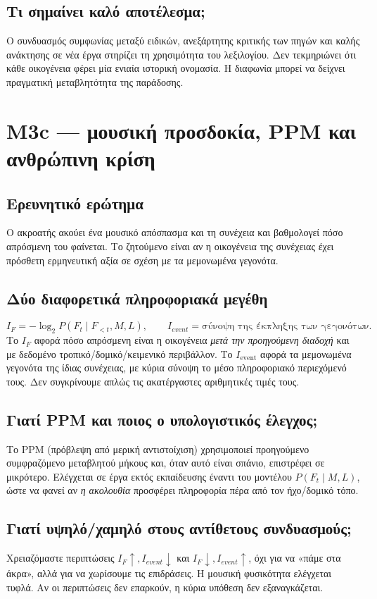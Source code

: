 \documentclass[11pt,a4paper]{extarticle}
\begin{document}
\subsection*{Τι σημαίνει καλό αποτέλεσμα;}
Ο συνδυασμός συμφωνίας μεταξύ ειδικών, ανεξάρτητης κριτικής των πηγών και καλής ανάκτησης σε νέα έργα στηρίζει τη χρησιμότητα του λεξιλογίου. Δεν τεκμηριώνει ότι κάθε οικογένεια φέρει μία ενιαία ιστορική ονομασία. Η διαφωνία μπορεί να δείχνει πραγματική μεταβλητότητα της παράδοσης.



\section{M3c — μουσική προσδοκία, PPM και ανθρώπινη κρίση}
\subsection*{Ερευνητικό ερώτημα}
Ο ακροατής ακούει ένα μουσικό απόσπασμα και τη συνέχεια και βαθμολογεί πόσο απρόσμενη του φαίνεται. Το ζητούμενο είναι αν η οικογένεια της συνέχειας έχει πρόσθετη ερμηνευτική αξία σε σχέση με τα μεμονωμένα γεγονότα.
\subsection*{Δύο διαφορετικά πληροφοριακά μεγέθη}
\[
I_F=-\log_2 P(F_t\mid F_{<t},M,L),\qquad I_{event}=\text{σύνοψη της έκπληξης των γεγονότων}.
\]
Το \(I_F\) αφορά πόσο απρόσμενη είναι η οικογένεια \emph{μετά την προηγούμενη διαδοχή} και με δεδομένο τροπικό/δομικό/κειμενικό περιβάλλον. Το \(I_{\mathrm{event}}\) αφορά τα μεμονωμένα γεγονότα της ίδιας συνέχειας, με κύρια σύνοψη το μέσο πληροφοριακό περιεχόμενό τους. Δεν συγκρίνουμε απλώς τις ακατέργαστες αριθμητικές τιμές τους.
\subsection*{Γιατί PPM και ποιος ο υπολογιστικός έλεγχος;}
Το PPM (πρόβλεψη από μερική αντιστοίχιση) χρησιμοποιεί προηγούμενο συμφραζόμενο μεταβλητού μήκους και, όταν αυτό είναι σπάνιο, επιστρέφει σε μικρότερο. Ελέγχεται σε έργα εκτός εκπαίδευσης έναντι του μοντέλου \(P(F_t\mid M,L)\), ώστε να φανεί αν \emph{η ακολουθία} προσφέρει πληροφορία πέρα από τον ήχο/δομικό τόπο.
\subsection*{Γιατί υψηλό/χαμηλό στους αντίθετους συνδυασμούς;}
Χρειαζόμαστε περιπτώσεις \(I_F\uparrow,I_{event}\downarrow\) και \(I_F\downarrow,I_{event}\uparrow\), όχι για να «πάμε στα άκρα», αλλά για να χωρίσουμε τις επιδράσεις. Η μουσική φυσικότητα ελέγχεται τυφλά. Αν οι περιπτώσεις δεν επαρκούν, η κύρια υπόθεση δεν εξαναγκάζεται.
\end{document}
